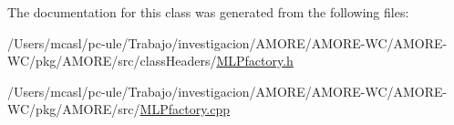 The documentation for this class was generated from the following files:\begin{DoxyCompactItemize}
\item 
/Users/mcasl/pc-\/ule/Trabajo/investigacion/AMORE/AMORE-\/WC/AMORE-\/WC/pkg/AMORE/src/classHeaders/\hyperlink{_m_l_pfactory_8h}{MLPfactory.h}\item 
/Users/mcasl/pc-\/ule/Trabajo/investigacion/AMORE/AMORE-\/WC/AMORE-\/WC/pkg/AMORE/src/\hyperlink{_m_l_pfactory_8cpp}{MLPfactory.cpp}\end{DoxyCompactItemize}
